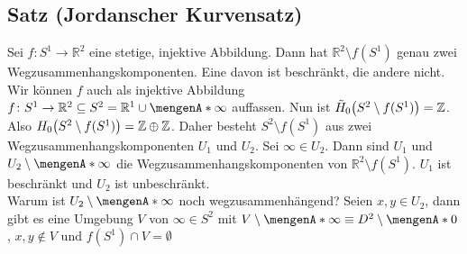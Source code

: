 \subsection{Satz (Jordanscher Kurvensatz)} %
\label{sub:109}
Sei $f \colon S^1 \to \mathds{R}^2$ eine stetige, injektive Abbildung. Dann hat $\mathds{R}^2 \setminus f(S^1)$ genau zwei Wegzusammenhangskomponenten. Eine davon ist 
beschränkt, die andere nicht.
Wir können $f$ auch als injektive Abbildung $f \colon S^1 \to \mathds{R}^2 \subseteq S^2 = \mathds{R}^1 \cup \set{\infty}$ auffassen. Nun ist 
$\tilde{H}_0 \enbrace[\big]{S^2 \setminus f(S^1)} =\mathds{Z}$. Also $H_0 \enbrace[\big]{S^2 \setminus f(S^1)}= \mathds{Z} \oplus \mathds{Z}$. Daher besteht
$S^2 \setminus f(S^1)$ aus zwei Wegzusammenhangskomponenten $U_1$ und $U_2$. Sei \oE $\infty \in U_2$. Dann sind $U_1$ und $U_2 \setminus \set{\infty}$ die
Wegzusammenhangskomponenten von $\mathds{R}^2 \setminus f(S^1)$. $U_1$ ist beschränkt und $U_2$ ist unbeschränkt. \bewende \smallskip \\
Warum ist $U_2 \setminus \set{\infty}$ noch wegzusammenhängend?
Seien $x,y \in U_2$, dann gibt es eine Umgebung $V$ von $\infty \in S^2$ mit $V \setminus \set{\infty} \equiv D^2 \setminus \set{0} $,  $x,y \not\in V$ und
$f(S^1) \cap V = \emptyset$

